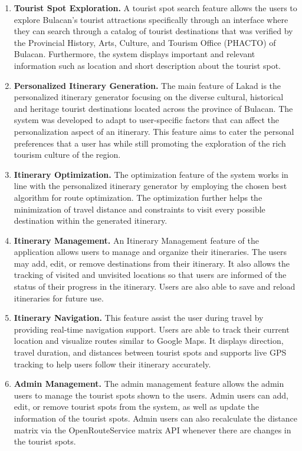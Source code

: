 \begin{enumerate}
	\item \textbf{Tourist Spot Exploration.}
		A tourist spot search feature allows the users to explore Bulacan’s tourist attractions specifically through an interface where they can search through a catalog of  tourist destinations that was verified by the Provincial History, Arts, Culture, and Tourism Office (PHACTO) of Bulacan. Furthermore, the system displays important and relevant information such as location and short description about the tourist spot.

	\item \textbf{Personalized Itinerary Generation.}
		The main feature of Lakad is the personalized itinerary generator focusing on the diverse cultural, historical and heritage tourist destinations located across the province of Bulacan. The system was developed to adapt to user-specific factors that can affect the personalization aspect of an itinerary. This feature aims to cater the personal preferences that a user has while still promoting the exploration of the rich tourism culture of the region.

	\item \textbf{Itinerary Optimization.}
		The optimization feature of the system works in line with the personalized itinerary generator by employing the chosen best algorithm for route optimization. The optimization further helps the minimization of travel distance and constraints to visit every possible destination within the generated itinerary.

	\item \textbf{Itinerary Management.}
		An Itinerary Management feature of the application allows users to manage and organize their itineraries. The users may add, edit, or remove destinations from their itinerary. It also allows the tracking of visited and unvisited locations so that users are informed of the status of their progress in the itinerary. Users are also able to save and reload itineraries for future use.

	\item \textbf{Itinerary Navigation.}
		This feature assist the user during travel by providing real-time navigation support. Users are able to track their current location and visualize routes similar to Google Maps. It displays direction, travel duration, and distances between tourist spots and supports live GPS tracking to help users follow their itinerary accurately.

	\item \textbf{Admin Management.}
		The admin management feature allows the admin users to manage the tourist spots shown to the users. Admin users can add, edit, or remove tourist spots from the system, as well as update the information of the tourist spots. Admin users can also recalculate the distance matrix via the OpenRouteService matrix API whenever there are changes in the tourist spots.
\end{enumerate}

